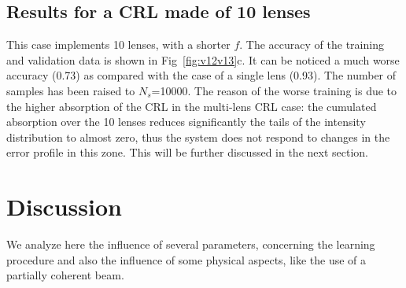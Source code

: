 \documentclass[preprint]{iucr}
\newcommand{\todo}[1]{{\color{red}[TODO: "#1'']}}
\newcommand{\inred}[1]{{\color{red}#1}}
\begin{document}

 

    




 \subsection{Results for a CRL made of 10 lenses}
 This case implements 10 lenses, with a shorter $f$. The accuracy of the training and validation data is shown in 
 Fig~\ref{fig:v12v13}c.
 It can be noticed a much worse accuracy (0.73) as compared with the case of a single lens (0.93). The number of samples has been raised to $N_s$=10000. The reason of the worse training is due to the higher absorption of the CRL in the multi-lens CRL case: the cumulated absorption over the 10 lenses reduces significantly the tails of the intensity distribution to almost zero, thus the system does not respond to changes in the error profile in this zone. This will be further discussed in the next section.



\section{Discussion}\label{sec:discussion}

We analyze here the influence of several parameters, concerning the learning procedure and also the influence of some physical aspects, like the use of a partially coherent beam.

\end{document}

